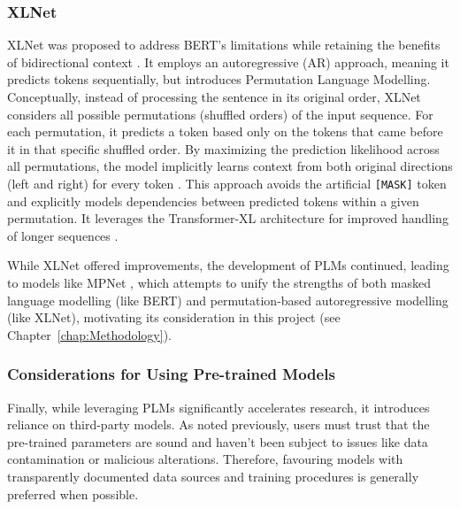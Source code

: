 \documentclass[10pt,oneside]{report}
\begin{document}
\subsubsection{XLNet}

XLNet was proposed to address BERT's limitations while retaining the benefits of bidirectional context \cite{yang2019xlnet}. It employs an autoregressive (AR) approach, meaning it predicts tokens sequentially, but introduces Permutation Language Modelling. Conceptually, instead of processing the sentence in its original order, XLNet considers all possible permutations (shuffled orders) of the input sequence. For each permutation, it predicts a token based only on the tokens that came before it in that specific shuffled order. By maximizing the prediction likelihood across all permutations, the model implicitly learns context from both original directions (left and right) for every token \cite{yang2019xlnet}. This approach avoids the artificial \texttt{[MASK]} token and explicitly models dependencies between predicted tokens within a given permutation. It leverages the Transformer-XL architecture for improved handling of longer sequences \cite{dai2019transformer}.

While XLNet offered improvements, the development of PLMs continued, leading to models like MPNet \cite{song2020mpnet}, which attempts to unify the strengths of both masked language modelling (like BERT) and permutation-based autoregressive modelling (like XLNet), motivating its consideration in this project (see Chapter~\ref{chap:Methodology}).

\subsubsection{Considerations for Using Pre-trained Models}

Finally, while leveraging PLMs significantly accelerates research, it introduces reliance on third-party models. As noted previously, users must trust that the pre-trained parameters are sound and haven't been subject to issues like data contamination or malicious alterations. Therefore, favouring models with transparently documented data sources and training procedures is generally preferred when possible.


\end{document}

